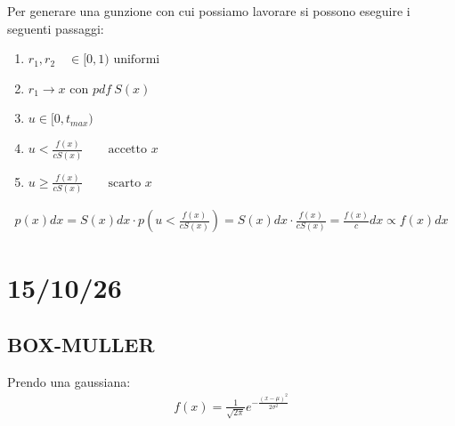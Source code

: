 \documentclass[a4paper, oneside]{article}
\begin{document}
Per generare una gunzione con cui possiamo lavorare si possono eseguire i seguenti passaggi:
\begin{enumerate}
    \item $r_1 , r_2 \quad \in [0,1) \text{ uniformi}$
    \item $r_1 \to x$ con $pdf \ S(x)$
    \item $u \in [0, t_{max})$
    \item $u < \frac{f(x)}{c S(x)} \qquad \text{accetto } x$
    \item $u \geq \frac{f(x)}{c S(x)} \qquad \text{scarto } x$
\end{enumerate}
\begin{gather*}
    p(x) dx = S(x) dx \cdot p(u < \frac{f(x)}{c S(x)}) = S(x) dx \cdot \frac{f(x)}{c S(x)} = \frac{f(x)}{c} dx \propto f(x) dx
\end{gather*}

\section{15/10/26}
\subsection{BOX-MULLER}

Prendo una gaussiana:
\begin{gather*}
    f(x) = \frac{1}{\sqrt{2\pi}} e ^{-\frac{(x-\mu)^2}{2\sigma^2}}
\end{gather*}
\end{document}
